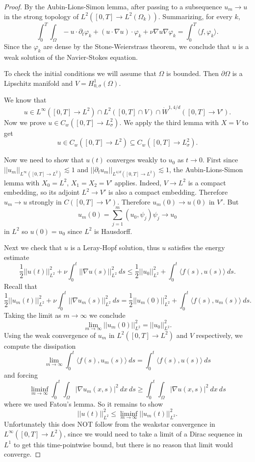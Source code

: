 \documentclass[12pt]{book}
\theoremstyle{definition}
\begin{document}
\begin{proof}
By the Aubin-Lions-Simon lemma, after passing to a subsequence $u_m \to u$ in the strong topology of $L^2([0, T] \to L^2(\Omega_k))$.
Summarizing, for every $k$,
$$\int_0^T \int_\Omega -u \cdot \partial_t \varphi_k + (u \cdot \nabla u) \cdot \varphi_k + \nu \nabla u \nabla \varphi_k = \int_0^T \langle f, \varphi_k\rangle.$$
Since the $\varphi_k$ are dense by the Stone-Weierstrass theorem, we conclude that $u$ is a weak solution of the Navier-Stokes equation.

To check the initial conditions we will assume that $\Omega$ is bounded.
Then $\partial \Omega$ is a Lipschitz manifold and $V = H^1_{0,\sigma}(\Omega)$.

We know that
$$u \in L^\infty([0, T] \to L^2) \cap L^2([0, T] \cap V) \cap \dot W^{1,4/d}([0, T] \to V').$$
Now we prove $u \in C_w([0, T] \to L^2_\sigma)$.
We apply the third lemma with $X = V$ to get
$$u \in C_w([0, T] \to L^2) \subseteq C_w([0, T] \to L^2_\sigma).$$

Now we need to show that $u(t)$ converges weakly to $u_0$ as $t \to 0$.
First since $||u_m||_{L^\infty([0, T] \to L^2)} \lesssim 1$ and $||\partial_t u_m||_{L^{4/d}([0, T] \to L^2)} \lesssim 1$, the Aubin-Lions-Simon lemma with $X_0 = L^2$, $X_1 = X_2 = V'$ applies.
Indeed, $V \to L^2$ is a compact embedding, so its adjoint $L^2 \to V'$ is also a compact embedding.
Therefore $u_m \to u$ strongly in $C([0, T] \to V')$.
Therefore $u_m(0) \to u(0)$ in $V'$.
But
$$u_m(0) = \sum_{j=1}^m (u_0, \psi_j)\psi_j \to u_0$$
in $L^2$ so $u(0) = u_0$ since $L^2$ is Hausdorff.

Next we check that $u$ is a Leray-Hopf solution, thus $u$ satisfies the energy estimate
$$\frac{1}{2} ||u(t)||_{L^2}^2 + \nu\int_0^t ||\nabla u(s)||_{L^2}^2 ~ds \leq \frac{1}{2} ||u_0||_{L^2}^2 + \int_0^t \langle f(s), u(s)\rangle ~ds.$$
Recall that
$$\frac{1}{2} ||u_m(t)||_{L^2}^2 + \nu\int_0^t ||\nabla u_m(s)||_{L^2}^2 ~ds = \frac{1}{2} ||u_m(0)||_{L^2}^2 + \int_0^t \langle f(s), u_m(s)\rangle ~ds.$$
Taking the limit as $m \to \infty$ we conclude
$$\lim_{m \to \infty} ||u_m(0)||_{L^2}^2 = ||u_0||_{L^2}^2.$$
Using the weak convergence of $u_m$ in $L^2([0, T] \to L^2)$ and $V$ respectively, we compute the dissipation
$$\lim_{m \to \infty} \int_0^t \langle f(s), u_m(s)\rangle ~ds = \int_0^t \langle f(s), u(s)\rangle ~ds$$
and forcing
$$\liminf_{m \to \infty} \int_0^t \int_\Omega |\nabla u_m(x, s)|^2 ~dx ~ds \geq \int_0^t \int_\Omega |\nabla u(x, s)|^2 ~dx ~ds$$
where we used Fatou's lemma.
So it remains to show
\begin{equation}
\label{energy liminf}
||u(t)||_{L^2}^2 \leq \liminf_{m \to \infty} ||u_m(t)||_{L^2}^2.
\end{equation}
Unfortunately this does NOT follow from the weakstar convergence in $L^\infty([0, T] \to L^2)$, since we would need to take a limit of a Dirac sequence in $L^1$ to get this time-pointwise bound, but there is no reason that limit would converge.


\end{proof}
\end{document}
